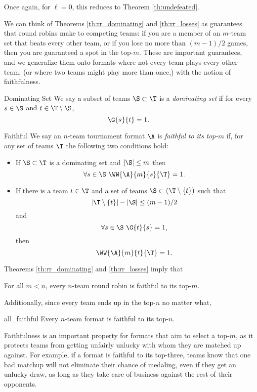 {    Once again, for $\ell = 0$, this reduces to Theorem \ref{th:undefeated}.

    We can think of Theorems \ref{th:rr_dominating} and \ref{th:rr_losses} as guarantees that round robins make to competing teams: if you are a member of an $m$-team set that beats every other team, or if you lose no more than $(m-1)/2$ games, then you are guaranteed a spot in the top-$m$. These are important guarantees, and we generalize them onto formats where not every team plays every other team, (or where two teams might play more than once,) with the notion of faithfulness.

    \begin{definition}{Dominating Set}{}
        We say a subset of teams $\S \subset \T$ is a \textit{dominating set} if for every $s \in \S$ and $t \in \T \setminus \S$, $$\G{s}{t} = 1.$$
    \end{definition}

    \begin{definition}{Faithful}{}
        We say an $n$-team tournament format $\A$ is \textit{faithful to its top-$m$} if, for any set of teams $\T$ the following two conditions hold:
        \begin{itemize}
            \item If $\S \subset \T$ is a dominating set and $|\S| \leq m$ then $$\forall s \in \S \ \WW{\A}{m}{s}{\T} = 1.$$
            \item If there is a team $t \in \T$ and a set of teams $\S \subset (\T \setminus \{t\})$ such that $$|\T \setminus \{t\}| - |\S| \leq (m-1)/2$$ and $$\forall s \in \S \ \G{t}{s} = 1,$$ then $$\WW{\A}{m}{t}{\T} = 1.$$
        \end{itemize}
    \end{definition}

    Theorems \ref{th:rr_dominating} and \ref{th:rr_losses} imply that

    \begin{corollary}{}{}
        For all $m < n$, every $n$-team round robin is faithful to its top-$m$.
    \end{corollary}

    Additionally, since every team ends up in the top-$n$ no matter what,

    \begin{theorem}{}{all_faithful}
        Every $n$-team format is faithful to its top-$n.$
    \end{theorem}

    Faithfulness is an important property for formats that aim to select a top-$m$, as it protects teams from getting unfairly unlucky with whom they are matched up against. For example, if a format is faithful to its top-three, teams know that one bad matchup will not eliminate their chance of medaling, even if they get an unlucky draw, as long as they take care of business against the rest of their opponents.

}
